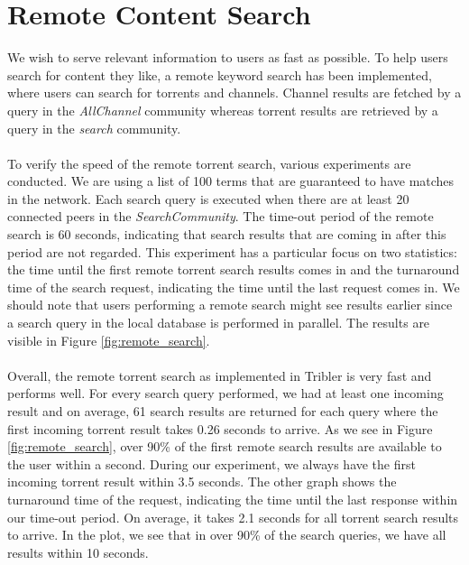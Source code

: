 \section{Remote Content Search}
\label{sec:remote-content-search-experiment}
We wish to serve relevant information to users as fast as possible. To help users search for content they like, a remote keyword search has been implemented, where users can search for torrents and channels. Channel results are fetched by a query in the \emph{AllChannel} community whereas torrent results are retrieved by a query in the \emph{search} community.\\\\
To verify the speed of the remote torrent search, various experiments are conducted. We are using a list of 100 terms that are guaranteed to have matches in the network. Each search query is executed when there are at least 20 connected peers in the \emph{SearchCommunity}. The time-out period of the remote search is 60 seconds, indicating that search results that are coming in after this period are not regarded. This experiment has a particular focus on two statistics: the time until the first remote torrent search results comes in and the turnaround time of the search request, indicating the time until the last request comes in. We should note that users performing a remote search might see results earlier since a search query in the local database is performed in parallel. The results are visible in Figure \ref{fig:remote_search}.\\\\
Overall, the remote torrent search as implemented in Tribler is very fast and performs well. For every search query performed, we had at least one incoming result and on average, 61 search results are returned for each query where the first incoming torrent result takes 0.26 seconds to arrive. As we see in Figure \ref{fig:remote_search}, over 90\% of the first remote search results are available to the user within a second. During our experiment, we always have the first incoming torrent result within 3.5 seconds. The other graph shows the turnaround time of the request, indicating the time until the last response within our time-out period. On average, it takes 2.1 seconds for all torrent search results to arrive. In the plot, we see that in over 90\% of the search queries, we have all results within 10 seconds.\\

